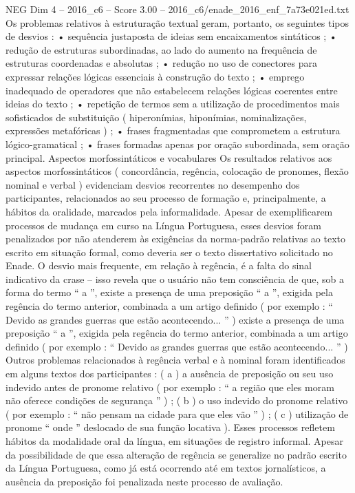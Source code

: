 \begin{textsample}{NEG Dim 4 – 2016\_c6 – Score 3.00 – 2016\_c6/enade\_2016\_enf\_7a73e021ed.txt}
Os problemas relativos à estruturação textual geram, portanto, os seguintes tipos de desvios : • sequência justaposta de ideias sem encaixamentos sintáticos ; • redução de estruturas subordinadas, ao lado do aumento na frequência de estruturas coordenadas e absolutas ; • redução no uso de conectores para expressar relações lógicas essenciais à construção do texto ; • emprego inadequado de operadores que não estabelecem relações lógicas coerentes entre ideias do texto ; • repetição de termos sem a utilização de procedimentos mais sofisticados de substituição ( hiperonímias, hiponímias, nominalizações, expressões metafóricas ) ; • frases fragmentadas que comprometem a estrutura lógico-gramatical ; • frases formadas apenas por oração subordinada, sem oração principal.
Aspectos morfossintáticos e vocabulares Os resultados relativos aos aspectos morfossintáticos ( concordância, regência, colocação de pronomes, flexão nominal e verbal ) evidenciam desvios recorrentes no desempenho dos participantes, relacionados ao seu processo de formação e, principalmente, a hábitos da oralidade, marcados pela informalidade.
Apesar de exemplificarem processos de mudança em curso na Língua Portuguesa, esses desvios foram penalizados por não atenderem às exigências da norma-padrão relativas ao texto escrito em situação formal, como deveria ser o texto dissertativo solicitado no Enade.
O desvio mais frequente, em relação à regência, é a falta do sinal indicativo da crase – isso revela que o usuário não tem consciência de que, sob a forma do termo “ a ”, existe a presença de uma preposição “ a ”, exigida pela regência do termo anterior, combinada a um artigo definido ( por exemplo : “ Devido as grandes guerras que estão acontecendo... ” ) existe a presença de uma preposição “ a ”, exigida pela regência do termo anterior, combinada a um artigo definido ( por exemplo : “ Devido as grandes guerras que estão acontecendo... ” ) Outros problemas relacionados à regência verbal e à nominal foram identificados em alguns textos dos participantes : ( a ) a ausência de preposição ou seu uso indevido antes de pronome relativo ( por exemplo : “ a região que eles moram não oferece condições de segurança ” ) ; ( b ) o uso indevido do pronome relativo ( por exemplo : “ não pensam na cidade para que eles vão ” ) ; ( c ) utilização de pronome “ onde ” deslocado de sua função locativa ).
Esses processos refletem hábitos da modalidade oral da língua, em situações de registro informal.
Apesar da possibilidade de que essa alteração de regência se generalize no padrão escrito da Língua Portuguesa, como já está ocorrendo até em textos jornalísticos, a ausência da preposição foi penalizada neste processo de avaliação.

\end{textsample}
